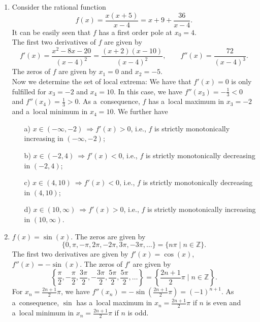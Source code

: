 \begin{example}
\begin{enumerate}
 \item Consider the rational function
\[f(x)=\frac{x(x+5)}{x-4}=x+9+\frac{36}{x-4}.\]
It can be easily seen that $f$ has a first order pole at $x_0=4$.\\
The first two derivatives of $f$ are given by
\[f'(x)=\frac{x^2-8x-20}{(x-4)^2}=\frac{(x+2)(x-10)}{(x-4)^2},\qquad f''(x)=\frac{72}{(x-4)^3}.\]
The zeros of $f$ are given by $x_1=0$ and $x_2=-5$.\\%
Now we determine the set of local extrema: We have that $f'(x)=0$ is only fulfilled for $x_3=-2$ and $x_4=10$. In this case, we have $f''(x_3)=-\frac13<0$ and $f''(x_4)=\frac13>0$. As a~consequence, $f$ has a~local maximum in $x_3=-2$ and a~local minimum in $x_4=10$. We further have
\begin{itemize}
 \item[a)] $x\in(-\infty,-2)~\Rightarrow f'(x)>0$, i.e., $f$ is strictly monotonically increasing in 
 $(-\infty,-2)$;
 \item[b)] $x\in(-2,4)~\Rightarrow f'(x)<0$, i.e., $f$ is strictly monotonically decreasing in $(-2,4)$;
 \item[c)] $x\in(4,10)~\Rightarrow f'(x)<0$, i.e., $f$ is strictly monotonically decreasing in $(4,10)$;
 \item[d)] $x\in(10,\infty)~\Rightarrow f'(x)>0$, i.e., $f$ is strictly monotonically increasing in 
 $(10,\infty)$.
\end{itemize}
\item $f(x)=\sin(x)$. The zeros are given by
    \[\{0,\pi,-\pi,2\pi,-2\pi,3\pi,-3\pi,\ldots\}=\{n\pi\;|\;n\in\mathbb{Z}\}.\]
The first two derivatives are given by $f'(x)=\cos(x)$, $f''(x)=-\sin(x)$. The zeros of $f'$ are given by
        \[\left\{\frac\pi2,-\frac\pi2,\frac{3\pi}2,-\frac{3\pi}2,\frac{5\pi}2,\frac{5\pi}2,\ldots\right\}=\left\{\frac{2n+1}2\pi\;|\;n\in\mathbb{Z}\right\}.\]
For $x_n=\frac{2n+1}2\pi$, we have $f''(x_n)=-\sin(\frac{2n+1}2\pi)=(-1)^{n+1}$. As a~consequence, $\sin$ has a~local maximum in $x_n=\frac{2n+1}2\pi$ if $n$ is even and a~local minimum in $x_n=\frac{2n+1}2\pi$ if $n$ is odd.
\end{enumerate}
\end{example}

